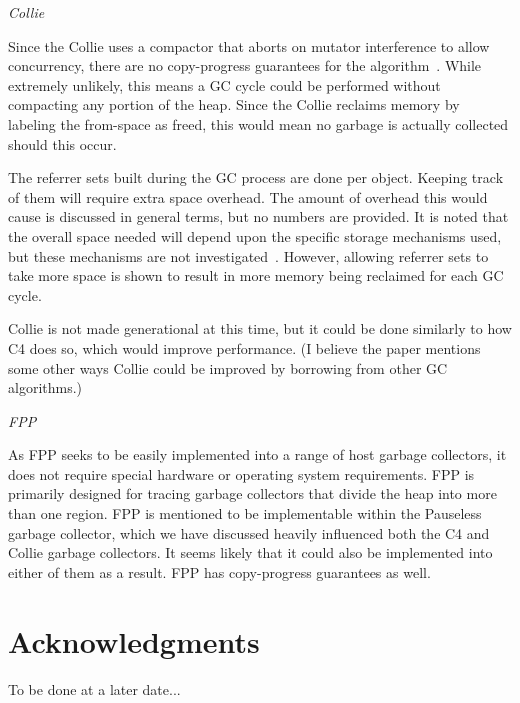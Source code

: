 \documentclass{sig-alternate}
\begin{document}
\emph{Collie}

Since the Collie uses a compactor that aborts on mutator interference to allow
concurrency, there are no copy-progress guarantees for the algorithm~\cite{Osterlund:FPP}.
While extremely unlikely, this means a GC cycle could be performed without compacting
any portion of the heap. Since the Collie reclaims memory by labeling the from-space as freed,
this would mean no garbage is actually collected should this occur.

The referrer sets built during the GC process are done per object. Keeping track of them
will require extra space overhead. The amount of overhead this would cause is discussed in
general terms, but no numbers are provided. It is noted that the overall space needed will 
depend upon the specific storage mechanisms used, but these mechanisms are not 
investigated~\cite{Iyengar:Collie}. However, allowing referrer sets to take
more space is shown to result in more memory being reclaimed for each GC cycle.

Collie is not made generational at this time, but it could be done similarly
to how C4 does so, which would improve performance. (I believe the paper
mentions some other ways Collie could be improved by borrowing from other
GC algorithms.)

\emph{FPP}

As FPP seeks to be easily implemented into a range of host garbage collectors, 
it does not require special hardware or operating system requirements. FPP
is primarily designed for tracing garbage collectors that divide the heap
into more than one region. 
FPP is mentioned to be implementable within the Pauseless garbage collector,
which we have discussed heavily influenced both the C4 and Collie garbage collectors.
It seems likely that it could also be implemented into either of them as a result.
FPP has copy-progress guarantees as well.


\section*{Acknowledgments}
\label{sec:acknowledgments}

To be done at a later date...



  
\end{document}
